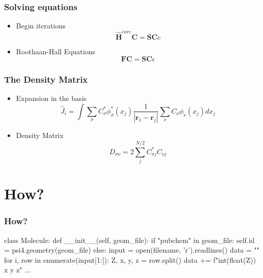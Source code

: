 \documentclass{beamer}
\begin{document}
\begin{frame}
    \frametitle{Solving equations}
    \begin{itemize}
        \item Begin iterations
        \begin{equation*}
            \boldsymbol{\hat{H}}^{core}\boldsymbol{C} = \boldsymbol{SC}c
        \end{equation*} 
        \item Roothaan-Hall Equations
        \begin{equation*}
            \boldsymbol{FC} = \boldsymbol{SC}\epsilon
        \end{equation*}
    \end{itemize}
\end{frame}


\begin{frame}
    \frametitle{The Density Matrix}
    \begin{itemize}
        \item Expansion in the basis
        \begin{equation*}
            \hat{J}_i = \int\sum_{\sigma}C^*_{\sigma}\phi^*_{\sigma}(x_j)\frac{1}{|\boldsymbol{r}_1 - \boldsymbol{r}_j|}\sum_{\nu}C_{\nu}\phi_{\nu}(x_j)dx_j
        \end{equation*}
        \item Density Matrix
        \begin{equation*}
            D_{\sigma\nu} = 2\sum^{N/2}_jC_{\sigma j}^*C_{\nu j}
        \end{equation*}
    \end{itemize}
\end{frame}

\section{How?}
\label{sec:how}
\begin{frame}[fragile]
    \frametitle{How?}
    \begin{python}
class Molecule:
    def __init__(self, geom_file):
        if "pubchem" in geom_file:
            self.id = psi4.geometry(geom_file)
        else:
            input = open(filename, 'r').readlines()
            data = ""
            for i, row in enumerate(input[1:]):
                Z, x, y, z = row.split()
                data += f"{int(float(Z))} {x} {y} {z}\n"
            ...       
    \end{python}
\end{frame}
\end{document}
